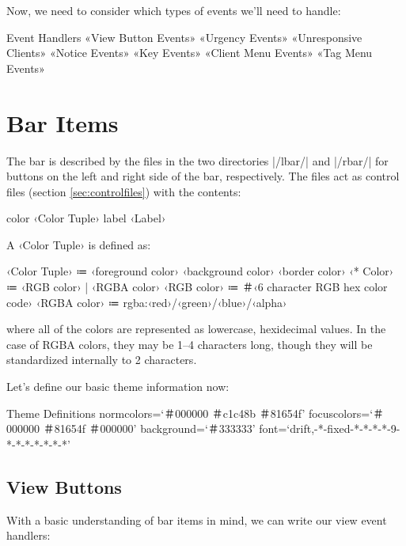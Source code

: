 Now, we need to consider which types of events we'll need to
handle:

\begin{Fragment}{Event Handlers}
  «View Button Events»
  «Urgency Events»
  «Unresponsive Clients»
  «Notice Events»
  «Key Events»
  «Client Menu Events»
  «Tag Menu Events»
\end{Fragment}

\section{Bar Items}

The bar is described by the files in the two directories |/lbar/| and
|/rbar/| for buttons on the left and right side of the bar,
respectively. The files act as control files (section
\ref{sec:controlfiles}) with the contents:

\begin{code}
  color ‹Color Tuple›
  label ‹Label›
\end{code}

A ‹Color Tuple› is defined as:

\begin{code}
  ‹Color Tuple› ≔ ‹foreground color› ‹background color› ‹border color›
  ‹* Color›     ≔ ‹RGB color› | ‹RGBA color›
  ‹RGB color›   ≔ ＃‹6 character RGB hex color code›
  ‹RGBA color›  ≔ rgba:‹red›/‹green›/‹blue›/‹alpha›
\end{code}

\noindent
where all of the colors are represented as lowercase,
hexidecimal values. In the case of RGBA colors, they may be 1--4
characters long, though they will be standardized internally to
2 characters.

\medskip

Let's define our basic theme information now:

\begin{Fragment}{Theme Definitions}
  normcolors=‘＃000000 ＃c1c48b ＃81654f’
  focuscolors=‘＃000000 ＃81654f ＃000000’
  background=‘＃333333’
  font=‘drift,-*-fixed-*-*-*-*-9-*-*-*-*-*-*-*’
\end{Fragment}

\subsection{View Buttons}

With a basic understanding of bar items in mind, we can write
our view event handlers:


